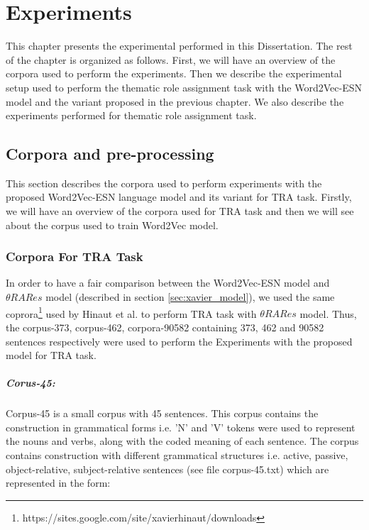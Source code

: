 \chapter{Experiments}\label{experiments}

This chapter presents the experimental performed in this Dissertation. The rest of the chapter is organized as follows. First, we will have an overview of the corpora used to perform the experiments. Then we describe the experimental setup used to perform the thematic role assignment task with the Word2Vec-ESN model and the variant proposed in the previous chapter. We also describe the experiments performed for thematic role assignment task.

\section{Corpora and pre-processing}\label{corpora}

This section describes the corpora used to perform experiments with the proposed Word2Vec-ESN language model and its variant for TRA task. Firstly, we will have an overview of the corpora used for TRA task and then we will see about the corpus used to train Word2Vec model.

\subsection{Corpora For TRA Task}

In order to have a fair comparison between the Word2Vec-ESN model and $\theta RARes$ model (described in section \ref{sec:xavier_model}), we used the same coprora\footnote{https://sites.google.com/site/xavierhinaut/downloads} used by Hinaut et al. \cite{xavier:2013:RT, tra:xavier_hri} to perform TRA task with $\theta RARes$ model. Thus, the corpus-373, corpus-462, corpora-90582 containing 373, 462 and 90582 sentences respectively were used to perform the Experiments with the proposed model for TRA task.  

\paragraph{Corus-45:}  Corpus-45 is a small corpus with 45 sentences. This corpus contains the construction in grammatical forms i.e. 'N' and 'V' tokens were used to represent the nouns and verbs, along with the coded meaning of each sentence. The corpus contains construction with different grammatical structures i.e. active, passive, object-relative, subject-relative sentences (see file corpus-45.txt) which are represented in the form:

